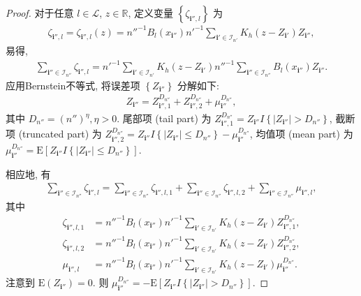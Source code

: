 \documentclass[a4paper,openay,14pt]{ctexbook}
\numberwithin{equation}{section}
\numberwithin{lem}{section}
\begin{document}
\begin{proof}
    对于任意 $l\in\mathcal{L}$, $z\in\mathbb{R}$, 定义变量 $\left\{ \zeta_{\mathbf{i}'',l}\right\}$ 为
    \begin{align*}
        \zeta_{\mathbf{i}'',l} = \zeta_{\mathbf{i}'',l}(z) = n''^{-1}B_{l}\left(x_{\mathbf{i}''}\right)n'^{-1}\sum_{\mathbf{i}'\in\mathcal{I}_{n'}}K_h(z-Z_{\mathbf{i}'})Z_{\mathbf{i}''},
    \end{align*}
   易得,
    \begin{align*}
        \sum_{\mathbf{i}''\in\mathcal{I}_{n''}}\zeta_{\mathbf{i}'',l}=n'^{-1}\sum_{\mathbf{i}'\in\mathcal{I}_{n'}}K_{h}\left(z-Z_{\mathbf{i}'}\right)n''^{-1}\sum_{\mathbf{i}''\in\mathcal{I}_{n''}}B_{l}\left(x_{\mathbf{i}''}\right)Z_{\mathbf{i}''}.
    \end{align*}
    应用Bernstein不等式, 将误差项 $\left\{ Z_{\mathbf{i}''}\right\}$ 分解如下:
    \begin{align*}
        Z_{\mathbf{i}''} = Z_{\mathbf{i}'',1}^{D_{n''}} + Z_{\mathbf{i}'',2}^{D_{n''}} + \mu_{\mathbf{i}''}^{D_{n''}}, 
    \end{align*}
    其中 $D_{n''} = \left(n''\right)^{\eta},\eta>0$. 尾部项 (tail part) 为 $Z_{\mathbf{i}'',1}^{D_{n''}} = Z_{\mathbf{i}''}I\left\{\vert Z_{\mathbf{i}''}\vert>D_{n''}\right\}$, 截断项 (truncated part) 为 $Z_{\mathbf{i}'',2}^{D_{n''}} = Z_{\mathbf{i}''}I\left\{\vert Z_{\mathbf{i}''}\vert\leq D_{n''}\right\} - \mu_{\mathbf{i}''}^{D_{n''}}$, 均值项 (mean part) 为 $   \mu_{\mathbf{i}''}^{D_{n''}} = \mathrm{E}\left[Z_{\mathbf{i}''}I\left\{\vert Z_{\mathbf{i}''}\vert\leq D_{n''}\right\}\right].$

    相应地, 有
    \begin{align*} 
        \sum_{\mathbf{i}''\in\mathcal{I}_{n''}}\zeta_{\mathbf{i}'',l} =  \sum_{\mathbf{i}''\in\mathcal{I}_{n''}}\zeta_{\mathbf{i}'',l,1}+\sum_{\mathbf{i}''\in\mathcal{I}_{n''}}\zeta_{\mathbf{i}'',l,2}+\sum_{\mathbf{i}''\in\mathcal{I}_{n''}}\mu_{\mathbf{i}'',l},
    \end{align*}
    其中
    \begin{align*}
        \zeta_{\mathbf{i}'',l,1} &= n''^{-1}B_{l}\left(x_{\mathbf{i}''}\right)n'^{-1}\sum_{\mathbf{i}'\in\mathcal{I}_{n'}}K_h(z-Z_{\mathbf{i}'})Z_{\mathbf{i}'',1}^{D_{n''}},\\
        \zeta_{\mathbf{i}'',l,2}& = n''^{-1}B_{l}\left(x_{\mathbf{i}''}\right)n'^{-1}\sum_{\mathbf{i}'\in\mathcal{I}_{n'}}K_h(z-Z_{\mathbf{i}'})Z_{\mathbf{i}'',2}^{D_{n''}},\\
        \mu_{\mathbf{i}'',l}& = n''^{-1}B_{l}\left(x_{\mathbf{i}''}\right)n'^{-1}\sum_{\mathbf{i}'\in\mathcal{I}_{n'}}K_h(z-Z_{\mathbf{i}'})\mu_{\mathbf{i}''}^{D_{n''}}.
    \end{align*}
    注意到 $\mathrm{E}(Z_{\mathbf{i}''}) = 0$. 则 $\mu_{\mathbf{i}''}^{D_{n''}} = -\mathrm{E}\left[Z_{\mathbf{i}''}I \left\{\vert Z_{\mathbf{i}''}\vert>D_{n''}\right\}\right]$. 
    

\end{proof}
\end{document}
